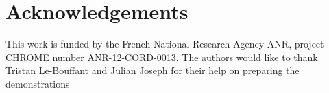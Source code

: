 \section*{Acknowledgements}
This work is funded by the French National Research Agency ANR, project CHROME number ANR-12-CORD-0013. The authors would like to thank Tristan Le-Bouffant and Julian Joseph for their help on preparing the demonstrations